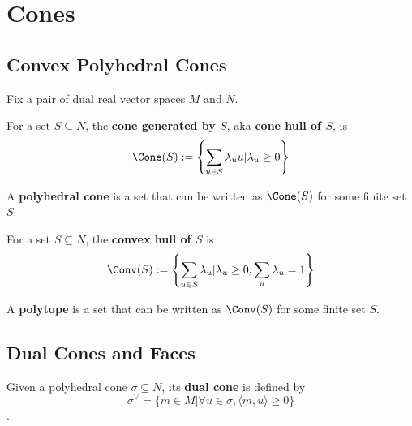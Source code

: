 \section{Cones}

\subsection{Convex Polyhedral Cones}

Fix a pair of dual real vector spaces $M$ and $N$.


\begin{definition}
  \label{1-2-1-cone-hull}
  \leanok

  For a set $S \subseteq N$, the {\bf cone generated by $S$}, aka {\bf cone hull of $S$}, is
  $$\Cone(S) := \left\{\sum_{u \in S} \lambda_u u | \lambda_u \ge 0\right\}$$
\end{definition}


\begin{definition}
  \label{1-2-1-polyhedral-cone}
  \leanok

  A {\bf polyhedral cone} is a set that can be written as $\Cone(S)$ for some finite set $S$.
\end{definition}


\begin{definition}
  \label{1-2-2-convex-hull}
  \leanok

  For a set $S \subseteq N$, the {\bf convex hull of $S$} is
  $$\Conv(S) := \left\{\sum_{u \in S} \lambda_u | \lambda_u \ge 0, \sum_u \lambda_u = 1\right\}$$
\end{definition}


\begin{definition}[Polytope]
  \label{1-2-2-polytope}
  \leanok

  A {\bf polytope} is a set that can be written as $\Conv(S)$ for some finite set $S$.
\end{definition}


\subsection{Dual Cones and Faces}


\begin{definition}
  \label{1-2-3-dual-cone}
  \leanok

  Given a polyhedral cone $\sigma \subseteq N$, its {\bf dual cone} is defined by
  $$\sigma^\vee = \{m \in M | \forall u \in \sigma, \langle m, u\rangle \ge 0\}$$.
\end{definition}


